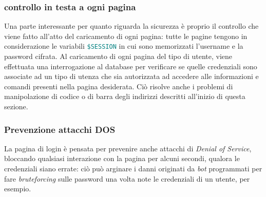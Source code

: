 \documentclass{article}
\newcommand{\sqltrigger}[1]{\texttt{\textcolor{teal}{#1}}}
\newcommand{\und}[0]{\textunderscore}
\begin{document}
\subsubsection{controllo in testa a ogni pagina}
Una parte interessante per quanto riguarda la sicurezza è proprio il controllo che viene fatto all'atto del caricamento di ogni pagina: tutte le pagine tengono in considerazione le variabili \sqltrigger{\$\und SESSION} in cui sono memorizzati l'username e la password cifrata. Al caricamento di ogni pagina del tipo di utente, viene effettuata una interrogazione al database per verificare se quelle credenziali sono associate ad un tipo di utenza che sia autorizzata ad accedere alle informazioni e comandi presenti nella pagina desiderata. Ciò risolve anche i problemi di manipolazione di codice o di barra degli indirizzi descritti all'inizio di questa sezione.
\subsubsection{Prevenzione attacchi DOS}
La pagina di login è pensata per prevenire anche attacchi di \textit{Denial of Service}, bloccando qualsiasi interazione con la pagina per alcuni secondi, qualora le credenziali siano errate: ciò può arginare i danni originati da \textit{bot} programmati per fare \textit{bruteforcing} sulle password una volta note le credenziali di un utente, per esempio.
\end{document}
